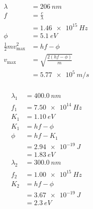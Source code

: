 \documentclass{article}
\begin{document}
\begin{align*}
  \lambda                      & = \qty{206}{nm}                   \\
  f                            & = \frac{c}{\lambda}               \\
                               & = \qty{1.46e15}{Hz}               \\
  \phi                         & = \qty{5.1}{eV}                   \\
  \frac{1}{2} m v_\text{max}^2 & = h f - \phi                      \\
  v_\text{max}                 & = \sqrt{\frac{2 (h f - \phi)}{m}} \\
                               & = \qty{5.77e5}{m/s}
\end{align*}

\setcounter{subsubsection}{8}
\subsubsection{}

\begin{align*}
  \lambda_1 & = \qty{400.0}{nm}   \\
  f_1       & = \qty{7.50e14}{Hz} \\
  K_1       & = \qty{1.10}{eV}    \\
  K_1       & = h f - \phi        \\
  \phi      & = h f - K_1         \\
            & = \qty{2.94e-19}{J} \\
            & = \qty{1.83}{eV}    \\
  \lambda_2 & = \qty{300.0}{nm}   \\
  f_2       & = \qty{1.00e15}{Hz} \\
  K_2       & = h f - \phi        \\
            & = \qty{3.67e-19}{J} \\
            & = \qty{2.3}{eV}
\end{align*}

\setcounter{subsubsection}{10}
\subsubsection{}
\end{document}

